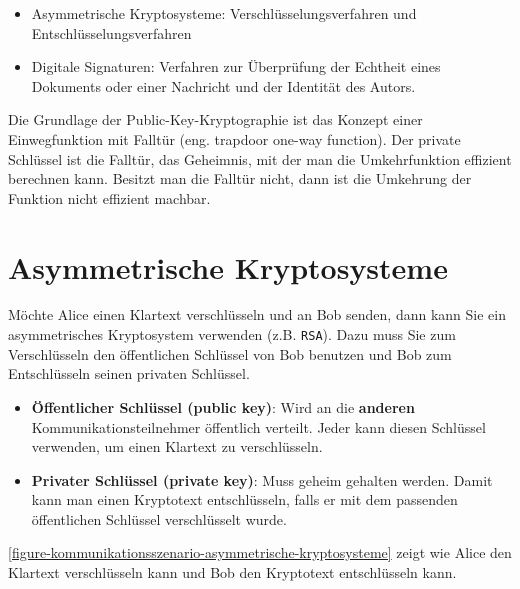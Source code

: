 \begin{itemize}
	\item Asymmetrische Kryptosysteme: Verschlüsselungsverfahren und Entschlüsselungsverfahren
	\item Digitale Signaturen: Verfahren zur Überprüfung der Echtheit eines Dokuments oder einer Nachricht und der Identität des Autors.
\end{itemize}

Die Grundlage der Public-Key-Kryptographie ist das Konzept einer Einwegfunktion mit Falltür (eng. trapdoor one-way function). Der private Schlüssel ist die Falltür, das Geheimnis, mit der man die Umkehrfunktion effizient berechnen kann. Besitzt man die Falltür nicht, dann ist die Umkehrung der Funktion nicht effizient machbar.

\section{Asymmetrische Kryptosysteme}

Möchte Alice einen Klartext verschlüsseln und an Bob senden, dann kann Sie ein asymmetrisches Kryptosystem verwenden (z.B. \texttt{RSA}). Dazu muss Sie zum Verschlüsseln den öffentlichen Schlüssel von Bob benutzen und Bob zum Entschlüsseln seinen privaten Schlüssel.

\begin{itemize}
	\item \textbf{Öffentlicher Schlüssel (public key)}: Wird an die \textbf{anderen} Kommunikationsteilnehmer öffentlich verteilt. Jeder kann diesen Schlüssel verwenden, um einen Klartext zu verschlüsseln.
	\item \textbf{Privater Schlüssel (private key)}: Muss geheim gehalten werden. Damit kann man einen Kryptotext entschlüsseln, falls er mit dem passenden öffentlichen Schlüssel verschlüsselt wurde.
\end{itemize}

\autoref{figure-kommunikationsszenario-asymmetrische-kryptosysteme} zeigt wie Alice den Klartext verschlüsseln kann und Bob den Kryptotext entschlüsseln kann.

